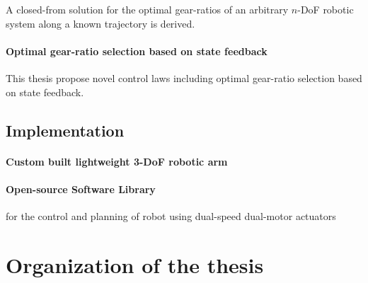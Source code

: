 A closed-from solution for the optimal gear-ratios of an arbitrary $n$-DoF robotic system along a known trajectory is derived.

\paragraph{Optimal gear-ratio selection based on state feedback}

This thesis propose novel control laws including optimal gear-ratio selection based on state feedback. 

\subsection{Implementation}

\paragraph{Custom built lightweight 3-DoF robotic arm}

\paragraph{Open-source Software Library}

for the control and planning of robot using dual-speed dual-motor actuators


\section{Organization of the thesis}
\label{sec:OrganisationOfTheThesis}




